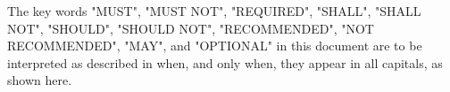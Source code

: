The key words "MUST", "MUST NOT", "REQUIRED", "SHALL", "SHALL NOT", "SHOULD",
"SHOULD NOT", "RECOMMENDED", "NOT RECOMMENDED", "MAY", and "OPTIONAL" in this
document are to be interpreted as described in  when, and
only when, they appear in all capitals, as shown here.
